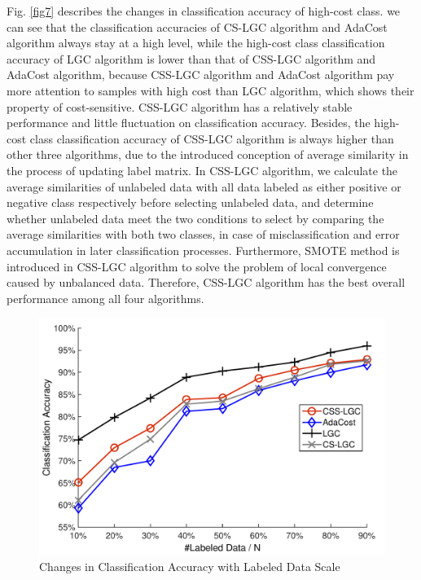 \documentclass{svjour3}                     %
\begin{document}
Fig. \ref{fig7} describes the changes in classification accuracy of high-cost class. we can see that the classification accuracies of CS-LGC algorithm and AdaCost algorithm always stay at a high level, while the high-cost class classification accuracy of LGC algorithm is lower than that of CSS-LGC algorithm and AdaCost algorithm, because CSS-LGC algorithm and AdaCost algorithm pay more attention to samples with high cost than LGC algorithm, which shows their property of cost-sensitive. CSS-LGC algorithm has a relatively stable performance and little fluctuation on classification accuracy. Besides, the high-cost class classification accuracy of CSS-LGC algorithm is always higher than other three algorithms, due to the introduced conception of average similarity in the process of updating label matrix. In CSS-LGC algorithm, we calculate the average similarities of unlabeled data with all data labeled as either positive or negative class respectively before selecting unlabeled data, and determine whether unlabeled data meet the two conditions to select by comparing the average similarities with both two classes, in case of misclassification and error accumulation in later classification processes. Furthermore, SMOTE method is introduced in CSS-LGC algorithm to solve the problem of local convergence caused by unbalanced data. Therefore, CSS-LGC algorithm has the best overall performance among all four algorithms.

\begin{figure}[h]
\includegraphics[width=\textwidth]{plot/fig8.pdf}
\caption{Changes in Classification Accuracy with Labeled Data Scale} \label{fig8}
\end{figure}
\end{document}
